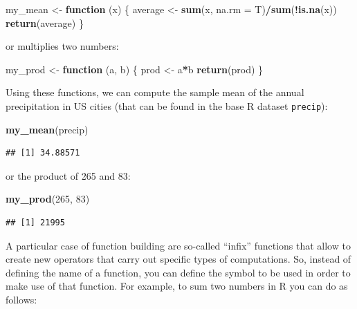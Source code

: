 \documentclass[12pt,]{krantz}
\newenvironment{Shaded}{\begin{snugshade}}{\end{snugshade}}
\newcommand{\KeywordTok}[1]{\textcolor[rgb]{0.27,0.27,0.27}{\textbf{#1}}}
\newcommand{\DataTypeTok}[1]{\textcolor[rgb]{0.27,0.27,0.27}{#1}}
\newcommand{\DecValTok}[1]{\textcolor[rgb]{0.06,0.06,0.06}{#1}}
\newcommand{\StringTok}[1]{\textcolor[rgb]{0.5,0.5,0.5}{#1}}
\newcommand{\ControlFlowTok}[1]{\textcolor[rgb]{0.27,0.27,0.27}{\textbf{#1}}}
\newcommand{\OperatorTok}[1]{\textcolor[rgb]{0.43,0.43,0.43}{\textbf{#1}}}
\newcommand{\NormalTok}[1]{#1}
\begin{document}
\begin{Shaded}
\begin{Highlighting}[]
\NormalTok{my_mean <-}\StringTok{ }\ControlFlowTok{function}\NormalTok{ (x) \{}
\NormalTok{  average <-}\StringTok{ }\KeywordTok{sum}\NormalTok{(x, }\DataTypeTok{na.rm =}\NormalTok{ T)}\OperatorTok{/}\KeywordTok{sum}\NormalTok{(}\OperatorTok{!}\KeywordTok{is.na}\NormalTok{(x))}
  \KeywordTok{return}\NormalTok{(average)}
\NormalTok{\}}
\end{Highlighting}
\end{Shaded}

or multiplies two numbers:

\begin{Shaded}
\begin{Highlighting}[]
\NormalTok{my_prod <-}\StringTok{ }\ControlFlowTok{function}\NormalTok{ (a, b) \{}
\NormalTok{  prod <-}\StringTok{ }\NormalTok{a}\OperatorTok{*}\NormalTok{b}
  \KeywordTok{return}\NormalTok{(prod)}
\NormalTok{\}}
\end{Highlighting}
\end{Shaded}

Using these functions, we can compute the sample mean of the annual
precipitation in US cities (that can be found in the base R dataset
\texttt{precip}):

\begin{Shaded}
\begin{Highlighting}[]
\KeywordTok{my_mean}\NormalTok{(precip)}
\end{Highlighting}
\end{Shaded}

\begin{verbatim}
## [1] 34.88571
\end{verbatim}

or the product of 265 and 83:

\begin{Shaded}
\begin{Highlighting}[]
\KeywordTok{my_prod}\NormalTok{(}\DecValTok{265}\NormalTok{, }\DecValTok{83}\NormalTok{)}
\end{Highlighting}
\end{Shaded}

\begin{verbatim}
## [1] 21995
\end{verbatim}

A particular case of function building are so-called ``infix'' functions
that allow to create new operators that carry out specific types of
computations. So, instead of defining the name of a function, you can
define the symbol to be used in order to make use of that function. For
example, to sum two numbers in R you can do as follows:
\end{document}
